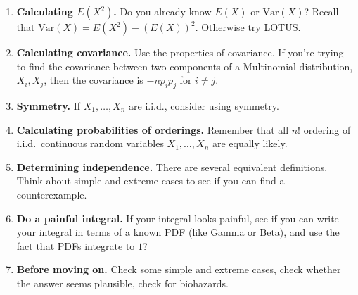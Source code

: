 \documentclass[6pt, landscape]{article}
\newcommand{\var}{\textrm{Var}}
\begin{document}
\begin{multicols}{3}
\begin{enumerate}
                \item \textbf{Calculating $E(X^2)$.}  Do you already know $E(X)$ or $\var(X)$? Recall that $\var(X) = E(X^2) - (E(X))^2$. Otherwise try LOTUS.
                \item \textbf{Calculating covariance.} Use the properties of covariance. If you're trying to find the covariance between two components of a Multinomial distribution, $X_i, X_j$, then the covariance is $-np_ip_j$ for $i \neq j$.
                \item \textbf{Symmetry.} If $X_1,\dots,X_n$ are i.i.d., consider using symmetry.
                \item \textbf{Calculating probabilities of orderings.} Remember that all $n!$ ordering of i.i.d.~continuous random variables $X_1,\dots,X_n$ are equally likely.
                \item \textbf{Determining independence.} There are several equivalent definitions. Think about simple and extreme cases to see if you can find a counterexample.
                \item \textbf{Do a painful integral.} If your integral looks painful, see if you can write your integral in terms of a known PDF (like Gamma or Beta), and use the fact that PDFs integrate to $1$?
                \item \textbf{Before moving on.} Check some simple and extreme cases, check whether the answer seems plausible, check for biohazards.\end{enumerate}



\end{multicols}
\end{document}
